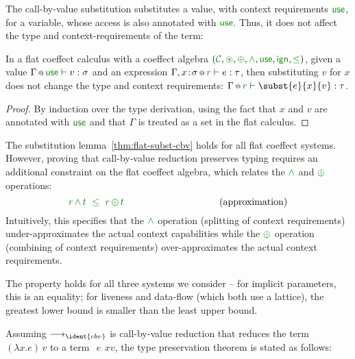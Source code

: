 \noindent
The call-by-value substitution substitutes a value, with context requirements $\cunit$, for a 
variable, whose access is also annotated with $\cunit$. Thus, it does not affect the type and
context-requirements of the term:

\begin{lemma}
\label{thm:flat-subst-cbv}
In a flat coeffect calculus with a coeffect algebra $(\C, \cseq, \cpar, \czip, \cunit, \czero, \cleq)$,
given a value $\coctx{\Gamma}{\cunit} \vdash v : \sigma$ and an expression
$\coctx{\Gamma,  x\!:\!\sigma}{ \cclrd{r}  } \vdash e : \tau$, then substituting $v$ for $x$ does not
change the type and context requirements: $\coctx{\Gamma}{ \cclrd{r} } \vdash \subst{e}{x}{v} : \tau$.
\end{lemma}
\begin{proof}
By induction over the type derivation, using the fact that $x$ and $v$ are annotated
with $\cunit$ and that $\Gamma$ is treated as a set in the flat calculus.
\end{proof}

\noindent
The substitution lemma~\ref{thm:flat-subst-cbv} holds for all flat coeffect systems. However, 
proving that call-by-value reduction preserves typing requires an additional constraint on the
flat coeffect algebra, which relates the $\czip$ and $\cpar$ operations:
%
\begin{equation*}
\cclrd{r}\,\czip\,\cclrd{t}~\;\cleq~\;\cclrd{r}\,\cpar\,\cclrd{t}
\hspace{10em}\textnormal{(approximation)}
\end{equation*}
%
Intuitively, this specifies that the $\czip$ operation (splitting of context requirements) 
under-approximates the actual context capabilities while the $\cpar$ operation (combining of
context requirements) over-approximates the actual context requirements.

The property holds for all three systems we consider -- for implicit parameters, this is 
an equality; for liveness and data-flow (which both use a lattice), the greatest lower bound 
is smaller than the least upper bound.

Assuming $\reduce_{\ident{cbv}}$ is call-by-value reduction that reduces the term 
$(\lambda x.e)\,v$ to a term $\substack{e}{x}{v}$, the type preservation theorem is
stated as follows:

